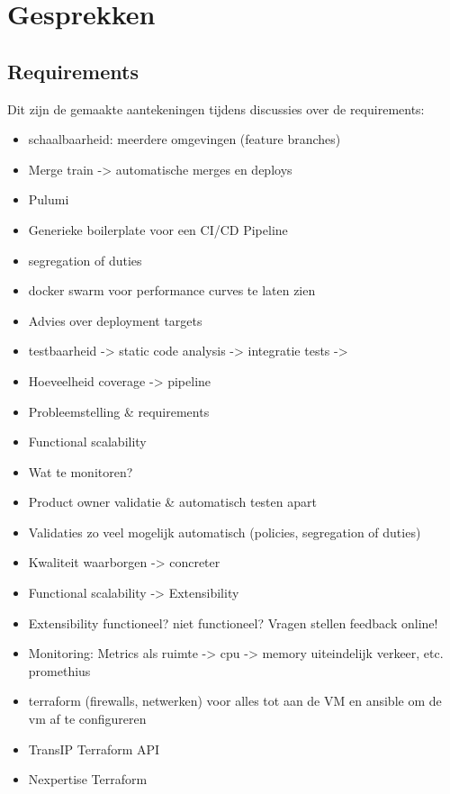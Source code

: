 
\chapter{Gesprekken} %

\label{Feedback} 

\section{Requirements}

\label{FeedbackRequirements}

Dit zijn de gemaakte aantekeningen tijdens discussies over de requirements:
\begin{itemize}
	\item schaalbaarheid: meerdere omgevingen (feature branches)
	\item Merge train -> automatische merges en deploys
	\item Pulumi
	\item Generieke boilerplate voor een CI/CD Pipeline
	\item segregation of duties
	\item docker swarm voor performance curves te laten zien
	\item Advies over deployment targets
	\item testbaarheid -> static code analysis -> integratie tests ->
	\item Hoeveelheid coverage -> pipeline 
	\item Probleemstelling \& requirements
	\item Functional scalability
	\item Wat te monitoren?
	\item Product owner validatie \& automatisch testen apart
	\item Validaties zo veel mogelijk automatisch (policies, segregation of duties)
	\item Kwaliteit waarborgen -> concreter
	\item Functional scalability -> Extensibility
	\item Extensibility functioneel? niet functioneel? Vragen stellen feedback online!
	\item Monitoring: Metrics als ruimte -> cpu -> memory uiteindelijk verkeer, etc. promethius
	\item terraform (firewalls, netwerken) voor alles tot aan de VM en ansible om de vm af te configureren
	\item TransIP Terraform API
	\item Nexpertise Terraform
\end{itemize}

